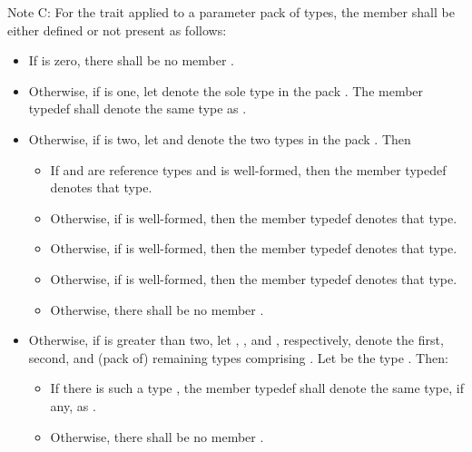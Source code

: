 \pnum
Note C: For the  trait applied to a parameter pack
 of types, the member  shall be either defined or not
present as follows:
\begin{itemize}
\item If  is zero, there shall be no member .

\item Otherwise, if  is one, let  denote the sole
  type in the pack . The member typedef  shall denote the
  same type as .

\item Otherwise, if  is two, let  and 
  denote the two types in the pack . Then
  \begin{itemize}
  \item If  and  are reference types and
     is well-formed, then the member
    typedef  denotes that type.

  \item Otherwise, if
    is well-formed, then the member typedef  denotes that type.

  \item Otherwise, if  is well-formed,
    then the member typedef  denotes that type.

  \item Otherwise, if  is well-formed, then the
    member typedef  denotes that type.

  \item Otherwise, there shall be no member .
  \end{itemize}

\item Otherwise, if  is greater than two, let ,
  , and , respectively, denote the first, second, and
  (pack of) remaining types comprising . Let  be the type
  . Then:
  \begin{itemize}
  \item If there is such a type , the member typedef  shall
    denote the same type, if any, as .

  \item Otherwise, there shall be no member .
  \end{itemize}
\end{itemize}


